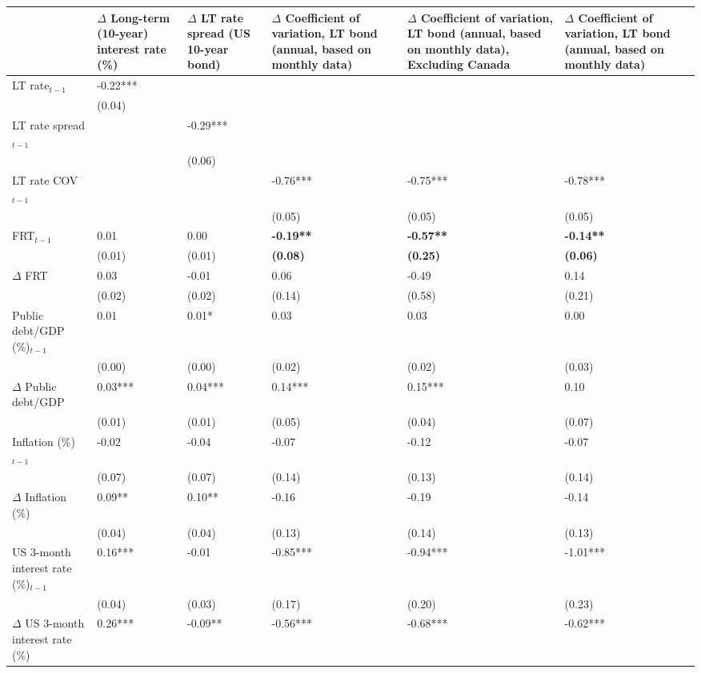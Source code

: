 {\tiny
\begin{tabular}{lp{2cm}p{2cm}p{2cm}p{2cm}p{2cm}}
  \hline
 & $\Delta$ Long-term (10-year) interest rate (\%) & $\Delta$ LT rate spread (US 10-year bond) & $\Delta$ Coefficient of variation, LT bond (annual, based on monthly data) & $\Delta$ Coefficient of variation, LT bond (annual, based on monthly data), \textbf{Excluding Canada} & $\Delta$ Coefficient of variation, LT bond (annual, based on monthly data) \\ 
  \hline
LT rate$_{t-1}$ & -0.22*** &  &  &  &  \\ 
   & (0.04) &  &  &  &  \\ 
  LT rate spread$_{t-1}$ &  & -0.29*** &  &  &  \\ 
   &  & (0.06) &  &  &  \\ 
  LT rate COV$_{t-1}$ &  &  & -0.76*** & -0.75*** & -0.78*** \\ 
   &  &  & (0.05) & (0.05) & (0.05) \\ 
  FRT$_{t-1}$ & 0.01 & 0.00 & \textbf{-0.19**} & \textbf{-0.57**} & \textbf{-0.14**} \\ 
   & (0.01) & (0.01) & \textbf{(0.08)} & \textbf{(0.25)} & \textbf{(0.06)} \\ 
  $\Delta$ FRT & 0.03 & -0.01 & 0.06 & -0.49 & 0.14 \\ 
   & (0.02) & (0.02) & (0.14) & (0.58) & (0.21) \\ 
  Public debt/GDP (\%)$_{t-1}$ & 0.01 & 0.01* & 0.03 & 0.03 & 0.00 \\ 
   & (0.00) & (0.00) & (0.02) & (0.02) & (0.03) \\ 
  $\Delta$ Public debt/GDP & 0.03*** & 0.04*** & 0.14*** & 0.15*** & 0.10 \\ 
   & (0.01) & (0.01) & (0.05) & (0.04) & (0.07) \\ 
  Inflation (\%) $_{t-1}$ & -0.02 & -0.04 & -0.07 & -0.12 & -0.07 \\ 
   & (0.07) & (0.07) & (0.14) & (0.13) & (0.14) \\ 
  $\Delta$ Inflation (\%) & 0.09** & 0.10** & -0.16 & -0.19 & -0.14 \\ 
   & (0.04) & (0.04) & (0.13) & (0.14) & (0.13) \\ 
  US 3-month interest rate (\%)$_{t-1}$ & 0.16*** & -0.01 & -0.85*** & -0.94*** & -1.01*** \\ 
   & (0.04) & (0.03) & (0.17) & (0.20) & (0.23) \\ 
  $\Delta$ US 3-month interest rate (\%) & 0.26*** & -0.09** & -0.56*** & -0.68*** & -0.62*** \\ 

\end{tabular}}
